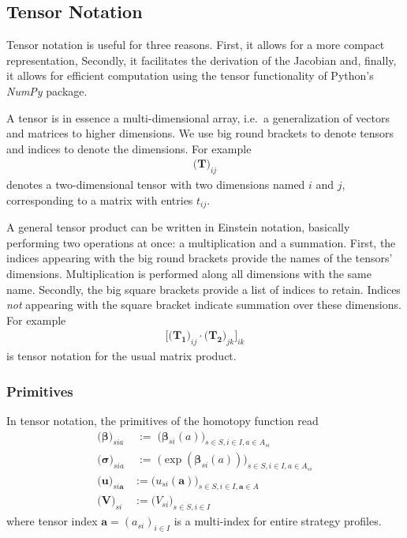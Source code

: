 \documentclass[11pt,fleqn]{article}
\newcommand{\bsigma}{\bm{\sigma}}
\newcommand{\bbeta}{\bm{\beta}}
\newcommand{\bV}{\bm{V}}
\newcommand{\ba}{\bm{a}}
\begin{document}
\subsection*{Tensor Notation}

Tensor notation is useful for three reasons. First, it allows for a more compact representation, Secondly, it facilitates the derivation of the Jacobian and, finally, it allows for efficient computation using the tensor functionality of Python's \textit{NumPy} package.

A tensor is in essence a multi-dimensional array, i.e.\ a generalization of vectors and matrices to higher dimensions. We use big round brackets to denote tensors and indices to denote the dimensions. For example
\begin{align*}
	\biggl( \bm{T} \biggr)_{ij}
\end{align*}
denotes a two-dimensional tensor with two dimensions named $i$ and $j$, corresponding to a matrix with entries $t_{ij}$.

A general tensor product can be written in Einstein notation, basically performing two operations at once: a multiplication and a summation. First, the indices appearing with the big round brackets provide the names of the tensors' dimensions. Multiplication is performed along all dimensions with the same name. Secondly, the big square brackets provide a list of indices to retain. Indices \emph{not} appearing with the square bracket indicate summation over these dimensions. For example
\begin{align*}
	\Biggl[ \biggl( \bm{T_1} \biggr)_{ij} \cdot \biggl( \bm{T_2} \biggr)_{jk} \Biggr]_{ik}
\end{align*}
is tensor notation for the usual matrix product.


\subsubsection*{Primitives}

In tensor notation, the primitives of the homotopy function read
\begin{align*}
	\biggl( \bbeta \biggr)_{sia} &\;:=\; \biggl( \bbeta_{si}(a) \biggr)_{s\in S, i\in I, a\in A_{si}} \\
	\biggl( \bsigma \biggr)_{sia} &\;:=\; \biggl( \exp(\bbeta_{si}(a)) \biggr)_{s\in S, i\in I, a\in A_{si}} \\
	\biggl( \bm{u} \biggr)_{si\ba} &:= \biggl( u_{si}(\ba) \biggr)_{s\in S, i\in I, \ba\in A} \\
	\biggl( \bV \biggr)_{si} &:= \biggl( V_{si} \biggr)_{s\in S, i\in I}
\end{align*}
where tensor index $\ba = (a_{si})_{i\in I}$ is a multi-index for entire strategy profiles.
\end{document}
